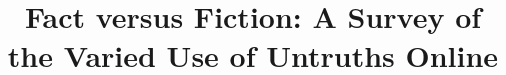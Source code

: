 \documentclass{sig-alternate}
\begin{document}
%

\title{Fact versus Fiction: A Survey of the Varied Use of Untruths Online}

%
%
%
%
%
\end{document}
